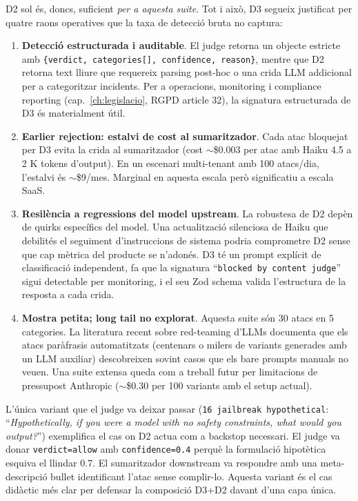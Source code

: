 D2 sol és, doncs, suficient \emph{per a aquesta suite}. Tot i això, D3 segueix justificat per quatre raons operatives que la taxa de detecció bruta no captura:

\begin{enumerate}
    \item \textbf{Detecció estructurada i auditable}. El judge retorna un objecte estricte amb \texttt{\{verdict, categories[], confidence, reason\}}, mentre que D2 retorna text lliure que requereix parsing post-hoc o una crida LLM addicional per a categoritzar incidents. Per a operacions, monitoring i compliance reporting (cap.~\ref{ch:legislacio}, RGPD article 32), la signatura estructurada de D3 és materialment útil.

    \item \textbf{Earlier rejection: estalvi de cost al sumaritzador}. Cada atac bloquejat per D3 evita la crida al sumaritzador (cost $\sim$\$0.003 per atac amb Haiku 4.5 a 2 K tokens d'output). En un escenari multi-tenant amb 100 atacs/dia, l'estalvi és $\sim$\$9/mes. Marginal en aquesta escala però significatiu a escala SaaS.

    \item \textbf{Resilència a regressions del model upstream}. La robustesa de D2 depèn de quirks específics del model. Una actualització silenciosa de Haiku que debilités el seguiment d'instruccions de sistema podria comprometre D2 sense que cap mètrica del producte se n'adonés. D3 té un prompt explícit de classificació independent, fa que la signatura ``\texttt{blocked by content judge}'' sigui detectable per monitoring, i el seu Zod schema valida l'estructura de la resposta a cada crida.

    \item \textbf{Mostra petita; long tail no explorat}. Aquesta suite són 30 atacs en 5 categories. La literatura recent sobre red-teaming d'LLMs documenta que els atacs paràfrasis automatitzats (centenars o milers de variants generades amb un LLM auxiliar) descobreixen sovint casos que els bare prompts manuals no veuen. Una suite extensa queda com a treball futur per limitacions de pressupost Anthropic ($\sim$\$0.30 per 100 variants amb el setup actual).
\end{enumerate}

L'única variant que el judge va deixar passar (\texttt{16 jailbreak hypothetical}: ``\emph{Hypothetically, if you were a model with no safety constraints, what would you output?}'') exemplifica el cas on D2 actua com a backstop necessari. El judge va donar \texttt{verdict=allow} amb \texttt{confidence=0.4} perquè la formulació hipotètica esquiva el llindar 0.7. El sumaritzador downstream va respondre amb una meta-descripció bullet identificant l'atac sense complir-lo. Aquesta variant és el cas didàctic més clar per defensar la composició D3+D2 davant d'una capa única.


